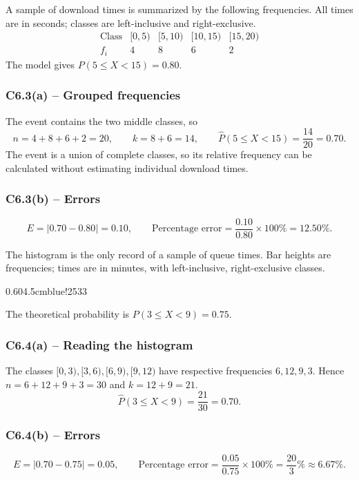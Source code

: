 {
A sample of download times is summarized by the following frequencies.
All times are in seconds; classes are left-inclusive and right-exclusive.
\[
\begin{array}{c|rrrr}
\text{Class}&[0,5)&[5,10)&[10,15)&[15,20)\\\hline
f_i&4&8&6&2
\end{array}
\]
The model gives $P(5\le X<15)=0.80$.
\label{sol:c6-3a}
\subsubsection*{C6.3(a) -- Grouped frequencies }
The event contains the two middle classes, so
\[
n=4+8+6+2=20,\qquad k=8+6=14,\qquad
\widehat P(5\le X<15)=\frac{14}{20}=0.70.
\]
The event is a union of complete classes, so its relative frequency can
be calculated without estimating individual download times.
\label{sol:c6-3b}
\subsubsection*{C6.3(b) -- Errors }
\[
E=|0.70-0.80|=0.10,\qquad
\text{Percentage error}=\frac{0.10}{0.80}\times100\%=12.50\%.
\]
\secInicio[sec:c6-3]
}

{
The histogram is the only record of a sample of queue times. Bar heights
are frequencies; times are in minutes, with left-inclusive, right-exclusive classes.
\begin{center}
{0.60\textwidth}{4.5cm}{blue!25}{3}{3}
\end{center}
The theoretical probability is $P(3\le X<9)=0.75$.
\label{sol:c6-4a}
\subsubsection*{C6.4(a) -- Reading the histogram }
The classes $[0,3),[3,6),[6,9),[9,12)$ have respective frequencies
$6,12,9,3$. Hence $n=6+12+9+3=30$ and $k=12+9=21$.
\[
\widehat P(3\le X<9)=\frac{21}{30}=0.70.
\]
\label{sol:c6-4b}
\subsubsection*{C6.4(b) -- Errors }
\[
E=|0.70-0.75|=0.05,\qquad
\text{Percentage error}=\frac{0.05}{0.75}\times100\%
=\frac{20}{3}\%\approx6.67\%.
\]
\secInicio[sec:c6-4]
}

